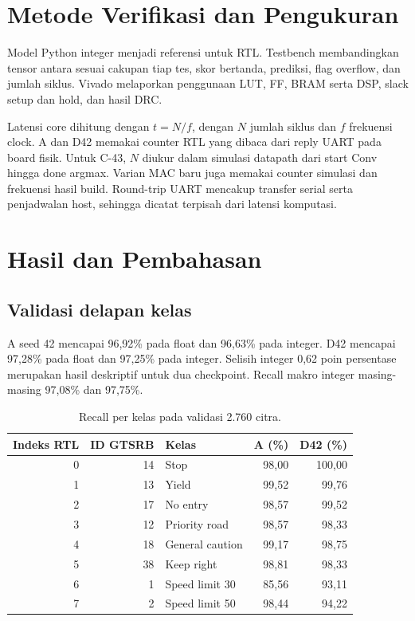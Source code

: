 \documentclass[11pt,a4paper]{article}
\begin{document}
\section{Metode Verifikasi dan Pengukuran}
Model Python integer menjadi referensi untuk RTL. Testbench
membandingkan tensor antara sesuai cakupan tiap tes, skor bertanda,
prediksi, flag overflow, dan jumlah siklus. Vivado melaporkan
penggunaan LUT, FF, BRAM serta DSP, slack setup dan hold, dan hasil DRC.

Latensi core dihitung dengan \(t=N/f\), dengan \(N\) jumlah siklus
dan \(f\) frekuensi clock. A dan D42 memakai counter RTL yang dibaca
dari reply UART pada board fisik. Untuk C-43, \(N\) diukur dalam
simulasi datapath dari start Conv hingga done argmax. Varian MAC baru
juga memakai counter simulasi dan frekuensi hasil build. Round-trip UART
mencakup transfer serial serta penjadwalan host, sehingga dicatat
terpisah dari latensi komputasi.

\section{Hasil dan Pembahasan}
\subsection{Validasi delapan kelas}
A seed 42 mencapai 96,92\% pada float dan 96,63\% pada integer.
D42 mencapai 97,28\% pada float dan 97,25\% pada integer. Selisih
integer 0,62 poin persentase merupakan hasil deskriptif untuk dua
checkpoint. Recall makro integer masing-masing 97,08\% dan 97,75\%.

\begin{table}[H]
\centering
\caption{Recall per kelas pada validasi 2.760 citra.}
\begin{tabular}{rrlrr}
\toprule
Indeks RTL & ID GTSRB & Kelas & A (\%) & D42 (\%) \\
\midrule
0 & 14 & Stop & 98,00 & 100,00 \\
1 & 13 & Yield & 99,52 & 99,76 \\
2 & 17 & No entry & 98,57 & 99,52 \\
3 & 12 & Priority road & 98,57 & 98,33 \\
4 & 18 & General caution & 99,17 & 98,75 \\
5 & 38 & Keep right & 98,81 & 98,33 \\
6 & 1 & Speed limit 30 & 85,56 & 93,11 \\
7 & 2 & Speed limit 50 & 98,44 & 94,22 \\
\bottomrule
\end{tabular}
\end{table}
\end{document}
